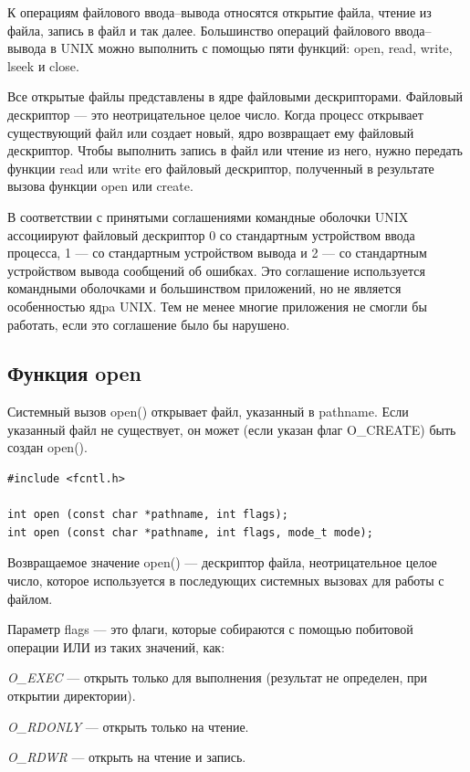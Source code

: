 К операциям файлового ввода--вывода относятся открытие файла, чтение из файла, запись в файл и так далее. Большинство операций файлового ввода--вывода в UNIX можно выполнить с помощью пяти функций: open, read, write, lseek и close. 

Все открытые файлы представлены в ядре файловыми дескрипторами. Файловый дескриптор --- это неотрицательное целое число. Когда процесс открывает существующий файл или создает новый, ядро возвращает ему файловый дескриптор. Чтобы выполнить запись в файл или чтение из него, нужно передать функции read или write его файловый дескриптор, полученный в результате вызова функции open или create.

В соответствии с принятыми соглашениями командные оболочки UNIX ассоциируют файловый дескриптор 0 со стандартным устройством ввода процесса, 1 --- со стандартным устройством вывода и 2 --- со стандартным устройством вывода сообщений об ошибках. Это соглашение используется командными оболочками и большинством приложений, но не является особенностью ядpa UNIX. Тем не менее многие приложения не смогли бы работать, если это соглашение было бы нарушено.

\subsection{Функция open}

Системный вызов open() открывает файл, указанный в pathname. Если указанный файл не существует, он может (если указан флаг O\_CREATE) быть создан open().

\begin{lstlisting}[label=code:open,caption=Функция open]
#include <fcntl.h>

int open (const char *pathname, int flags);
int open (const char *pathname, int flags, mode_t mode);
\end{lstlisting}

Возвращаемое значение open() --- дескриптор файла, неотрицательное целое число, которое используется в последующих системных вызовах для работы с файлом.

Параметр flags --- это флаги, которые собираются с помощью побитовой операции ИЛИ из таких значений, как:

\textit{O\_EXEC} — открыть только для выполнения (результат не определен, при открытии директории).

\textit{O\_RDONLY} — открыть только на чтение.

\textit{O\_RDWR} — открыть на чтение и запись.

